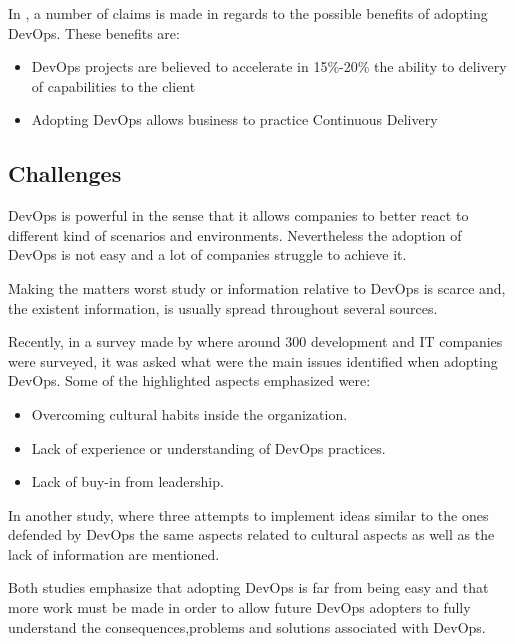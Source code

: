       In \cite{Elliot2015}, a number of claims is made in regards to the possible benefits of adopting DevOps.
      These benefits are:
		\begin{itemize}
			\item{DevOps projects are believed to accelerate in 15\%-20\% the ability to delivery of capabilities to the client }
            
            \item{Adopting DevOps allows business to practice Continuous Delivery}
		\end{itemize}
      
      
      \subsection{Challenges}\label{devops:challenges}
    
    	DevOps is powerful in the sense that it allows companies to better react to different kind of scenarios and environments. Nevertheless the adoption of DevOps is not easy and a lot of companies struggle to achieve it. 
    
        Making the matters worst study or information relative to DevOps is scarce \cite{SaugatuckTechnology2014} and, the existent information, is usually spread throughout several sources. 

        Recently, in a survey made by \cite{SaugatuckTechnology2014} where around 300 development and IT companies were surveyed, it was asked what were the main issues identified when adopting DevOps. Some of the highlighted aspects emphasized  were: 
        \begin{itemize}
       	    \item{Overcoming cultural habits inside the organization.}
            \item{Lack of experience or understanding of DevOps practices.}
            \item{Lack of buy-in from leadership.}
    	\end{itemize}
        
        In another study, \cite{Debois2008} where three attempts to implement ideas similar to the ones defended by DevOps the same aspects related to cultural aspects as well as the lack of information are mentioned.
        	
        Both studies emphasize that adopting DevOps is far from being easy and that more work must be made in order to allow future DevOps adopters to fully understand the consequences,problems and solutions associated with DevOps.
      


